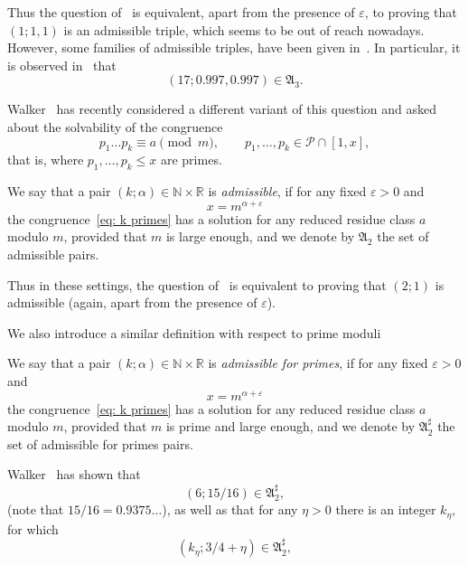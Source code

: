 \documentclass[12pt]{amsart}
\begin{document}
Thus  the question of~\cite{EOS} is equivalent, apart from the presence of $\varepsilon$,
 to proving that $(1;1,1)$ is an
admissible triple, which seems to be out of reach nowadays.
However,  some families of admissible triples, have been given in~\cite[Theorem~3]{Shp}.
In particular,  it is observed  in~\cite[Section~4]{Shp}
that 
\begin{equation}
\label{eq: 17 0.997}
(17;0.997,0.997) \in {{\mathfrak A}}_3.
\end{equation}

Walker~\cite{Wal} has recently considered a different variant of this question
and asked about the solvability of the congruence 
\begin{equation}
\label{eq: k primes}
p_1\ldots p_k \equiv a \pmod m, \qquad p_1,\ldots, p_k \in {{\mathcal P}}  \cap [1,x], 
\end{equation}
that is, where $p_1,\ldots, p_k \le x$ are primes. 

\begin{definition}
\label{def:pair} 
We say that a pair $(k; \alpha) \in {{\mathbb N}} \times {{\mathbb R}}$ is {\it admissible\/}, 
if for any fixed $\varepsilon > 0$ and 
$$
x = m^{\alpha+\varepsilon}  
$$    
the congruence~\eqref{eq: k primes}
has a solution for any reduced residue class $a$ modulo $m$, provided that $m$ is
large enough, and we denote by ${{\mathfrak A}}_2$ the set of admissible pairs.
\end{definition}

Thus in these settings, the question of~\cite{EOS} is equivalent to proving that $(2;1)$ is 
admissible (again, apart from the presence of $\varepsilon$). 

We also introduce a similar definition with respect to prime moduli
\begin{definition}
\label{def:pair Prime} 
We say that a pair $(k; \alpha) \in {{\mathbb N}} \times {{\mathbb R}}$ is {\it admissible for primes\/}, 
if for any fixed $\varepsilon > 0$ and 
$$
x = m^{\alpha+\varepsilon}  
$$   
the congruence~\eqref{eq: k primes}
has a solution for any reduced residue class $a$ modulo $m$, provided that $m$ is prime
and large enough, and we denote by ${{\mathfrak A}}_2^\sharp$ the set of admissible for primes pairs.
\end{definition}

Walker~\cite[Theorem~2]{Wal} has shown that 
\begin{equation}
\label{eq: 6 15/16}
(6; 15/16)  \in {{\mathfrak A}}_2^\sharp,
\end{equation}
(note that  $15/16 = 0.9375\ldots $), as well as that for any $\eta> 0$
there is an integer $k_\eta$, for which 
\begin{equation}
\label{eq: k0 3/4}
(k_\eta; 3/4+\eta)  \in {{\mathfrak A}}_2^\sharp,
\end{equation}
\end{document}
